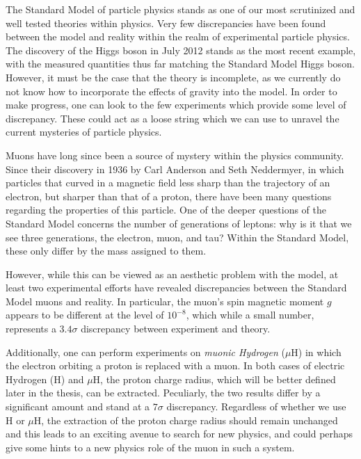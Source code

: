 \label{chapter:introduction}

The Standard Model of particle physics stands as one of our most scrutinized and well tested theories within physics. Very few discrepancies have been found between the model and reality within the realm of experimental particle physics. The discovery of the Higgs boson in July 2012 stands as the most recent example, with the measured quantities thus far matching the Standard Model Higgs boson. However, it must be the case that the theory is incomplete, as we currently do not know how to incorporate the effects of gravity into the model. In order to make progress, one can look to the few experiments which provide some level of discrepancy. These could act as a loose string which we can use to unravel the current mysteries of particle physics.

Muons have long since been a source of mystery within the physics community. Since their discovery in 1936 by Carl Anderson and Seth Neddermyer, in which particles that curved in a magnetic field less sharp than the trajectory of an electron, but sharper than that of a proton, there have been many questions regarding the properties of this particle. One of the deeper questions of the Standard Model concerns the number of generations of leptons: why is it that we see three generations, the electron, muon, and tau? Within the Standard Model, these only differ by the mass assigned to them.

However, while this can be viewed as an aesthetic problem with the model, at least two experimental efforts have revealed discrepancies between the Standard Model muons and reality. In particular, the muon's spin magnetic moment $g$ appears to be different at the level of $10^{-8}$, which while a small number, represents a $3.4\sigma$ discrepancy between experiment and theory.\cite{2007PhLB..649..173H}

Additionally, one can perform experiments on \emph{muonic Hydrogen} ($\mu\textrm{H}$) in which the electron orbiting a proton is replaced with a muon. In both cases of electric Hydrogen (H) and $\mu\textrm{H}$, the proton charge radius, which will be better defined later in the thesis, can be extracted. Peculiarly, the two results differ by a significant amount  and stand at a $7\sigma$ discrepancy.\cite{Carlson:2015jba} Regardless of whether we use H or $\mu\textrm{H}$, the extraction of the proton charge radius should remain unchanged and this leads to an exciting avenue to search for new physics, and could perhaps give some hints to a new physics role of the muon in such a system.

